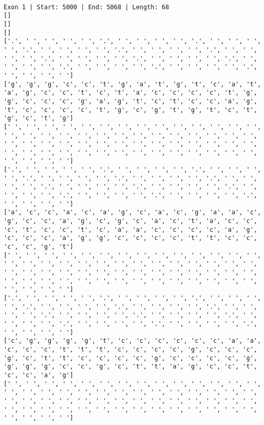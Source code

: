 \documentclass{article}
\begin{document}
 \begin{Verbatim}
 
Exon 1 | Start: 5000 | End: 5068 | Length: 68
[]
[]
[]
['.', ' ', ' ', ' ', ' ', '.', ' ', ' ', ' ', ' ', '.', ' ', ' ', ' ', ' ', '.', ' ', ' ', ' ', ' ', '.', ' ', ' ', ' ', ' ', '.', ' ', ' ', ' ', ' ', '.', ' ', ' ', ' ', ' ', '.', ' ', ' ', ' ', ' ', '.', ' ', ' ', ' ', ' ', '.', ' ', ' ', ' ', ' ', '.', ' ', ' ', ' ', ' ', '.', ' ', ' ', ' ', ' ']
['g', 'g', 'g', 'c', 'c', 't', 'g', 'a', 't', 'g', 't', 'c', 'a', 't', 'a', 'g', 'c', 'c', 't', 'c', 't', 'a', 'c', 'c', 'c', 'c', 't', 'g', 'g', 'c', 'c', 'c', 'g', 'a', 'g', 't', 'c', 't', 'c', 'c', 'a', 'g', 't', 'c', 'c', 'c', 'c', 't', 'g', 'c', 'g', 't', 'g', 't', 'c', 't', 'g', 'c', 't', 'g']
[' ', ' ', ' ', ' ', ' ', ' ', ' ', ' ', ' ', ' ', ' ', ' ', ' ', ' ', ' ', ' ', ' ', ' ', ' ', ' ', ' ', ' ', ' ', ' ', ' ', ' ', ' ', ' ', ' ', ' ', ' ', ' ', ' ', ' ', ' ', ' ', ' ', ' ', ' ', ' ', ' ', ' ', ' ', ' ', ' ', ' ', ' ', ' ', ' ', ' ', ' ', ' ', ' ', ' ', ' ', ' ', ' ', ' ', ' ', ' ']
['.', ' ', ' ', ' ', ' ', '.', ' ', ' ', ' ', ' ', '.', ' ', ' ', ' ', ' ', '.', ' ', ' ', ' ', ' ', '.', ' ', ' ', ' ', ' ', '.', ' ', ' ', ' ', ' ', '.', ' ', ' ', ' ', ' ', '.', ' ', ' ', ' ', ' ', '.', ' ', ' ', ' ', ' ', '.', ' ', ' ', ' ', ' ', '.', ' ', ' ', ' ', ' ', '.', ' ', ' ', ' ', ' ']
['a', 'c', 'c', 'a', 'c', 'a', 'g', 'c', 'a', 'c', 'g', 'a', 'a', 'c', 'g', 'c', 'c', 'a', 'g', 'c', 'g', 'c', 'a', 'c', 't', 'a', 'c', 'c', 'c', 't', 'c', 'c', 't', 'c', 'a', 'a', 'c', 'c', 'c', 'c', 'a', 'g', 'c', 'c', 'c', 'a', 'g', 'g', 'c', 'c', 'c', 'c', 't', 't', 'c', 'c', 'c', 'c', 'g', 't']
[' ', ' ', ' ', ' ', ' ', ' ', ' ', ' ', ' ', ' ', ' ', ' ', ' ', ' ', ' ', ' ', ' ', ' ', ' ', ' ', ' ', ' ', ' ', ' ', ' ', ' ', ' ', ' ', ' ', ' ', ' ', ' ', ' ', ' ', ' ', ' ', ' ', ' ', ' ', ' ', ' ', ' ', ' ', ' ', ' ', ' ', ' ', ' ', ' ', ' ', ' ', ' ', ' ', ' ', ' ', ' ', ' ', ' ', ' ', ' ']
['.', ' ', ' ', ' ', ' ', '.', ' ', ' ', ' ', ' ', '.', ' ', ' ', ' ', ' ', '.', ' ', ' ', ' ', ' ', '.', ' ', ' ', ' ', ' ', '.', ' ', ' ', ' ', ' ', '.', ' ', ' ', ' ', ' ', '.', ' ', ' ', ' ', ' ', '.', ' ', ' ', ' ', ' ', '.', ' ', ' ', ' ', ' ', '.', ' ', ' ', ' ', ' ', '.', ' ', ' ', ' ', ' ']
['c', 'g', 'g', 'g', 'g', 't', 'c', 'c', 'c', 'c', 'c', 'c', 'a', 'a', 'c', 'c', 'c', 't', 't', 't', 'c', 'c', 'c', 'c', 'g', 'c', 'c', 'c', 'g', 'c', 't', 't', 'c', 'c', 'c', 'c', 'g', 'c', 'c', 'c', 'c', 'g', 'g', 'g', 'g', 'c', 'c', 'g', 'c', 't', 't', 'a', 'g', 'c', 'c', 't', 'c', 'c', 'a', 'g']
[' ', ' ', ' ', ' ', ' ', ' ', ' ', ' ', ' ', ' ', ' ', ' ', ' ', ' ', ' ', ' ', ' ', ' ', ' ', ' ', ' ', ' ', ' ', ' ', ' ', ' ', ' ', ' ', ' ', ' ', ' ', ' ', ' ', ' ', ' ', ' ', ' ', ' ', ' ', ' ', ' ', ' ', ' ', ' ', ' ', ' ', ' ', ' ', ' ', ' ', ' ', ' ', ' ', ' ', ' ', ' ', ' ', ' ', ' ', ' ']

\end{Verbatim}
\end{document}
